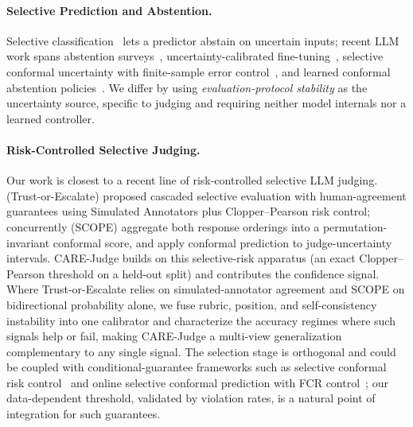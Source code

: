 \paragraph{Selective Prediction and Abstention.}
Selective classification~\citep{geifman2017selective,el2010foundations} lets a predictor abstain on uncertain inputs; recent LLM work spans abstention surveys~\citep{wen2025know}, uncertainty-calibrated fine-tuning~\citep{krishnan2024enhancing}, selective conformal uncertainty with finite-sample error control~\citep{wang2025sconu}, and learned conformal abstention policies~\citep{tayebati2025learning}. We differ by using \emph{evaluation-protocol stability} as the uncertainty source, specific to judging and requiring neither model internals nor a learned controller.

\paragraph{Risk-Controlled Selective Judging.}
Our work is closest to a recent line of risk-controlled selective LLM judging. \citet{jung2025trust} (Trust-or-Escalate) proposed cascaded selective evaluation with human-agreement guarantees using Simulated Annotators plus Clopper--Pearson risk control; concurrently \citet{badshah2026scope} (SCOPE) aggregate both response orderings into a permutation-invariant conformal score, and \citet{sheng2025analyzing} apply conformal prediction to judge-uncertainty intervals. CARE-Judge builds on this selective-risk apparatus (an exact Clopper--Pearson threshold on a held-out split) and contributes the confidence signal. Where Trust-or-Escalate relies on simulated-annotator agreement and SCOPE on bidirectional probability alone, we fuse rubric, position, and self-consistency instability into one calibrator and characterize the accuracy regimes where such signals help or fail, making CARE-Judge a multi-view generalization complementary to any single signal. The selection stage is orthogonal and could be coupled with conditional-guarantee frameworks such as selective conformal risk control~\citep{xu2025selective} and online selective conformal prediction with FCR control~\citep{bao2024cap}; our data-dependent threshold, validated by violation rates, is a natural point of integration for such guarantees.

